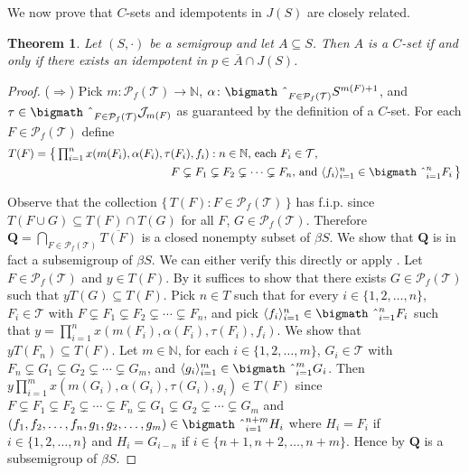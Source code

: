 \documentclass[12pt]{article}
\theoremstyle{plain}
\newtheorem{thm}{Theorem}[section]
\theoremstyle{definition}
\newcommand{\la}{\langle}
\newcommand{\ra}{\rangle}
\newcommand{\bbN}{\mathbb{N}}
\newcommand{\calJ}{\mathcal{J}}
\newcommand{\calT}{\mathcal{T}}
\newcommand{\Pf}{\mathcal{P}_f}
\newcommand{\bigtimes}{\hbox{\bigmath \char'2}}
\begin{document}
We now prove that $C$-sets and idempotents in $J(S)$ are closely related.
\begin{thm}
  Let $(S, \cdot)$ be a semigroup and let $A \subseteq S$. 
  Then $A$ is a $C$-set if and only if there exists an idempotent in $p \in \overline{A} \cap J(S)$.
\end{thm}
\begin{proof}
  ($\Rightarrow$)
  Pick $m \colon \Pf(\calT) \to \bbN$, $\alpha \colon \bigtimes_{F \in \Pf(\calT)} S^{m(F)+1}$, and $\tau \in \bigtimes_{F \in \Pf(\calT)} \calJ_{m(F)}$ as guaranteed by the definition of a $C$-set. 
  For each $F \in \Pf(\calT)$ define 
  \begin{align*}
    T(F) &= \bigl\{\, \textstyle \prod_{i=1}^n x(m(F_i), \alpha(F_i), \tau(F_i), f_i) : \mbox{$n \in \bbN$, each $F_i \in \calT$,}\\
 &\hspace{12em}\mbox{$F \subsetneq F_1 \subsetneq F_2 \subsetneq \cdots \subsetneq F_n$, and $\la f_i \ra_{i=1}^n \in \bigtimes_{i=1}^n F_i$} \,\bigr\}
  \end{align*}

  Observe that the collection $\{\, T(F) : F \in \Pf(\calT) \,\}$ has f.i.p. since $T(F \cup G) \subseteq T(F) \cap T(G)$ for all $F$, $G \in \Pf(\calT)$. 
  Therefore $\mathbf{Q} = \bigcap_{F \in \Pf(\calT)} \overline{T(F)}$ is a closed nonempty subset of $\beta S$. 
  We show that $\mathbf{Q}$ is in fact a subsemigroup of $\beta S$.
  We can either verify this directly or apply \cite[Theorem 4.20]{Hindman:1998fk}.
  Let $F \in \Pf(\calT)$ and $y \in T(F)$.
  By \cite[Theorem 4.20]{Hindman:1998fk} it suffices to show that there exists $G \in \Pf(\calT)$ such that $yT(G) \subseteq T(F)$. 
  Pick $n \in T$ such that for every $i \in \{1, 2, \ldots, n\}$, $F_i \in \calT$ with $F \subsetneq F_1 \subsetneq F_2 \subsetneq \cdots \subsetneq F_n$, and pick $\la f_i \ra_{i=1}^n \in \bigtimes_{i=1}^n F_i$ such that $y = \prod_{i=1}^n x(m(F_i), \alpha(F_i), \tau(F_i), f_i)$. 
  We show that $yT(F_n) \subseteq T(F)$. 
  Let $m \in \bbN$, for each $i \in \{1, 2, \ldots, m\}$, $G_i \in \calT$ with $F_n \subsetneq G_1 \subsetneq G_2 \subsetneq \cdots \subsetneq G_m$, and $\la g_i \ra_{i=1}^m \in \bigtimes_{i=1}^m G_i$. 
  Then $y \prod_{i=1}^m x(m(G_i), \alpha(G_i), \tau(G_i), g_i) \in T(F)$ since $F \subsetneq F_1 \subsetneq F_2 \subsetneq \cdots \subsetneq F_n \subsetneq G_1 \subsetneq G_2 \subsetneq \cdots \subsetneq G_m$ and $(f_1, f_2, \ldots, f_n, g_1, g_2, \ldots, g_m) \in \bigtimes_{i=1}^{n+m} H_i$ where $H_i = F_i$ if $i \in \{1, 2, \ldots, n\}$ and $H_i = G_{i-n}$ if $i \in \{n+1, n+2, \ldots, n+m\}$. 
  Hence by \cite[Theorem 4.20]{Hindman:1998fk} $\mathbf{Q}$ is a subsemigroup of $\beta S$. 


\end{proof}
\end{document}
